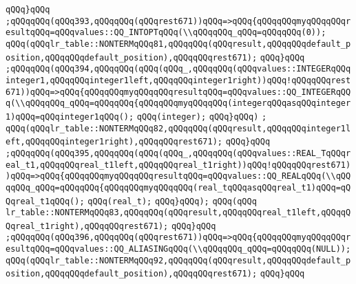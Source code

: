 \verb|qQQq}qQQq|\newline
\verb|;qQQqqQQq(qQQq393,qQQqqQQq(qQQqrest671))qQQq=>qQQq{qQQqqQQqmyqQQqqQQqresultqQQq=qQQqvalues::QQ_INTOPTqQQq(\\qQQqqQQq_qQQq=qQQqqQQq(0));|\newline
\verb|qQQq(qQQqlr_table::NONTERMqQQq81,qQQqqQQq(qQQqresult,qQQqqQQqdefault_position,qQQqqQQqdefault_position),qQQqqQQqrest671);|\newline
\verb|qQQq}qQQq|\newline
\verb|;qQQqqQQq(qQQq394,qQQqqQQq(qQQq(qQQq_,qQQqqQQq(qQQqvalues::INTEGERqQQqinteger1,qQQqqQQqinteger1left,qQQqqQQqinteger1right))qQQq!qQQqqQQqrest671))qQQq=>qQQq{qQQqqQQqmyqQQqqQQqresultqQQq=qQQqvalues::QQ_INTEGERqQQq(\\qQQqqQQq_qQQq=qQQqqQQq{qQQqqQQqmyqQQqqQQq(integerqQQqasqQQqinteger1)qQQq=qQQqinteger1qQQq();|\newline
\verb|qQQq(integer);|\newline
\verb|qQQq}qQQq)|\newline
\verb|;|\newline
\verb|qQQq(qQQqlr_table::NONTERMqQQq82,qQQqqQQq(qQQqresult,qQQqqQQqinteger1left,qQQqqQQqinteger1right),qQQqqQQqrest671);|\newline
\verb|qQQq}qQQq|\newline
\verb|;qQQqqQQq(qQQq395,qQQqqQQq(qQQq(qQQq_,qQQqqQQq(qQQqvalues::REAL_TqQQqreal_t1,qQQqqQQqreal_t1left,qQQqqQQqreal_t1right))qQQq!qQQqqQQqrest671))qQQq=>qQQq{qQQqqQQqmyqQQqqQQqresultqQQq=qQQqvalues::QQ_REALqQQq(\\qQQqqQQq_qQQq=qQQqqQQq{qQQqqQQqmyqQQqqQQq(real_tqQQqasqQQqreal_t1)qQQq=qQQqreal_t1qQQq();|\newline
\verb|qQQq(real_t);|\newline
\verb|qQQq}qQQq);|\newline
\verb|qQQq(qQQq|\newline
\verb|lr_table::NONTERMqQQq83,qQQqqQQq(qQQqresult,qQQqqQQqreal_t1left,qQQqqQQqreal_t1right),qQQqqQQqrest671);|\newline
\verb|qQQq}qQQq|\newline
\verb|;qQQqqQQq(qQQq396,qQQqqQQq(qQQqrest671))qQQq=>qQQq{qQQqqQQqmyqQQqqQQqresultqQQq=qQQqvalues::QQ_ALIASINGqQQq(\\qQQqqQQq_qQQq=qQQqqQQq(NULL));|\newline
\verb|qQQq(qQQqlr_table::NONTERMqQQq92,qQQqqQQq(qQQqresult,qQQqqQQqdefault_position,qQQqqQQqdefault_position),qQQqqQQqrest671);|\newline
\verb|qQQq}qQQq|\newline
